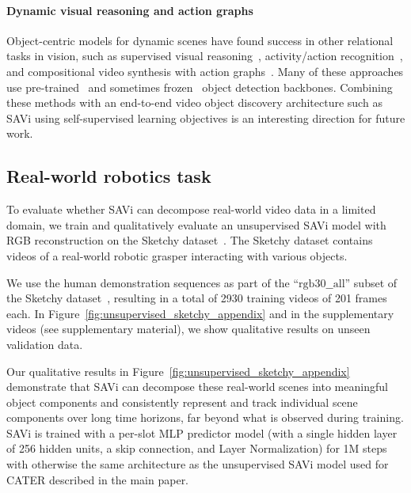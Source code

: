 \documentclass{article}
\begin{document}
\paragraph{Dynamic visual reasoning and action graphs}
Object-centric models for dynamic scenes have found success in other relational tasks in vision, such as supervised visual reasoning~\citep{yi2019clevrer,chen2021grounding,ding2021attention,ding2021dynamic}, activity/action recognition~\citep{jain2016structural,girdhar2019video,herzig2019spatio}, and compositional video synthesis with action graphs~\citep{bar2021compositional}. Many of these approaches use pre-trained~\citep{chen2021grounding} and sometimes frozen~\citep{yi2019clevrer,ding2021attention} object detection backbones. Combining these methods with an end-to-end video object discovery architecture such as SAVi using self-supervised learning objectives is an interesting direction for future work.

\subsection{Real-world robotics task}
\label{app:real_world_robotics}
To evaluate whether SAVi can decompose real-world video data in a limited domain, we train and qualitatively evaluate an unsupervised SAVi model with RGB reconstruction on the Sketchy dataset~\citep{cabi2020scaling}. The Sketchy dataset contains videos of a real-world robotic grasper interacting with various objects.

We use the human demonstration sequences as part of the ``$\mathrm{rgb30\_\_all}$'' subset of the Sketchy dataset~\citep{cabi2020scaling}, resulting in a total of 2930 training videos of 201 frames each. In Figure~\ref{fig:unsupervised_sketchy_appendix} and in the supplementary videos (see supplementary material), we show qualitative results on unseen validation data.

Our qualitative results in Figure~\ref{fig:unsupervised_sketchy_appendix} demonstrate that SAVi can decompose these real-world scenes into meaningful object components and consistently represent and track individual scene components over long time horizons, far beyond what is observed during training. SAVi is trained with a per-slot MLP predictor model (with a single hidden layer of 256 hidden units, a skip connection, and Layer Normalization) for 1M steps with otherwise the same architecture as the unsupervised SAVi model used for CATER described in the main paper.
\end{document}
